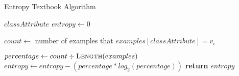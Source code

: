 \begin{algorithm}[H]
\caption{Entropy Textbook Algorithm}\label{a:id3-entropy-simple}
\begin{algorithmic}[1]
\renewcommand{\algorithmicrequire}{\textbf{Global Vars:}}
\Require $classAttribute$
    \State $entropy \gets 0$

        \State $count \gets$ number of examples that $examples[classAttribute] = v_i$

        \State $percentage \gets count \div \textsc{Length}(examples)$
            \State $entropy \gets entropy - (percentage * log_2 (percentage))$
        \EndIf
    \EndFor
    \State \textbf{return} $entropy$
\EndProcedure
\end{algorithmic}
\end{algorithm}
